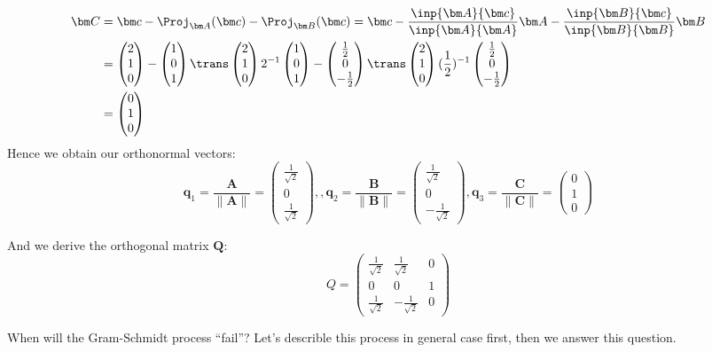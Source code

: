 \begin{example}
\begin{itemize}
\[\begin{aligned}
\bm C&=\bm c-\Proj_{\bm A}(\bm c)-\Proj_{\bm B}(\bm c)=\bm c-\frac{\inp{\bm A}{\bm c}}{\inp{\bm A}{\bm A}}\bm A-\frac{\inp{\bm B}{\bm c}}{\inp{\bm B}{\bm B}}\bm B\\
&=\begin{pmatrix}
2\\1\\0
\end{pmatrix}-\begin{pmatrix}
1\\0\\1
\end{pmatrix}\trans\begin{pmatrix}
2\\1\\0
\end{pmatrix}2^{-1}\begin{pmatrix}
1\\0\\1
\end{pmatrix}-\begin{pmatrix}
\frac{1}{2}\\0\\-\frac{1}{2}
\end{pmatrix}\trans\begin{pmatrix}
2\\1\\0
\end{pmatrix}(\frac{1}{2})^{-1}\begin{pmatrix}
\frac{1}{2}\\0\\-\frac{1}{2}
\end{pmatrix}\\
&=\begin{pmatrix}
0\\1\\0
\end{pmatrix}
\end{aligned}
\]
Hence we obtain our orthonormal vectors:
\[
\bm q_1=\frac{\bm A}{\|\bm A\|}
=\begin{pmatrix}
\frac{1}{\sqrt 2}\\0\\\frac{1}{\sqrt 2}
\end{pmatrix},
,\bm q_2=\frac{\bm B}{\|\bm B\|}
=\begin{pmatrix}
\frac{1}{\sqrt 2}\\0\\-\frac{1}{\sqrt 2}
\end{pmatrix}
,\bm q_3=\frac{\bm C}{\|\bm C\|}
=\begin{pmatrix}
0\\1\\0
\end{pmatrix}
\]
\end{itemize}
And we derive the orthogonal matrix $\bm Q$:
\[
Q=\begin{pmatrix}
\frac{1}{\sqrt 2}&\frac{1}{\sqrt 2}&0\\0&0&1\\
\frac{1}{\sqrt 2}&-\frac{1}{\sqrt 2}&0
\end{pmatrix}
\]
\end{example}
When will the Gram-Schmidt process ``fail''? Let's describle this process in general case first, then we answer this question.
